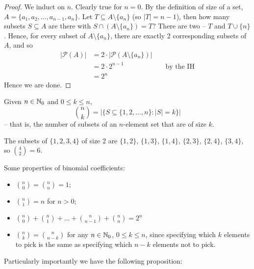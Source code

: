 \documentclass{../../template/note}
\begin{document}
    \begin{proof}
        We induct on \(n\). Clearly true for \(n = 0\). By the definition of size of a set, \(A = \{a_1, a_2, \dots, a_{n-1}, a_n\}\). Let \(T \subseteq A \setminus \{a_n\}\) (so \(|T| = n-1\)), then how many subsets \(S \subseteq A\) are there with \(S \cap (A \setminus \{a_n\}) = T\)? There are two -- \(T\) and \(T \cup \{n\}\). Hence, for every subset of \(A \setminus \{a_n\}\), there are exactly 2 corresponding subsets of \(A\), and so
        \begin{align*}
            |\mathcal P(A)| &= 2 \cdot |\mathcal P(A \setminus \{a_n\})| \\
            &= 2 \cdot 2^{n-1} && \text{ by the IH} \\
            &= 2^n
        \end{align*}
        Hence we are done.
    \end{proof}
    
    \begin{definition}
        Given \(n \in \mathbb N_0\) and \(0 \leq k \leq n\),
        \[
            \binom{n}{k} = |\{S \subseteq \{1, 2, \dots, n\}: |S| = k\}|
        \]
        -- that is, the number of subsets of an \(n\)-element set that are of size \(k\).
    \end{definition}
    
    \begin{example}
        The subsets of \(\{1, 2, 3, 4\}\) of size 2 are \(\{1, 2\}\), \(\{1, 3\}\), \(\{1, 4\}\), \(\{2, 3\}\), \(\{2, 4\}\), \(\{3, 4\}\), so \(\binom 4 2 = 6\).
    \end{example}
    
    Some properties of binomial coefficients:

    \begin{itemize}
        \item \(\binom n 0 = \binom n n = 1\);
        \item \(\binom n 1 = n\) for \(n > 0\);
        \item \(\binom n 0 + \binom n 1 + \dots + \binom n {n-1} + \binom n n = 2^n\)
        \item \(\binom n k = \binom n {n-k}\) for any \(n \in \mathbb N_0\), \(0 \leq k \leq n\), since specifying which \(k\) elements to pick is the same as specifying which \(n-k\) elements not to pick.
    \end{itemize}
    
    Particularly importantly we have the following proposition:
\end{document}
